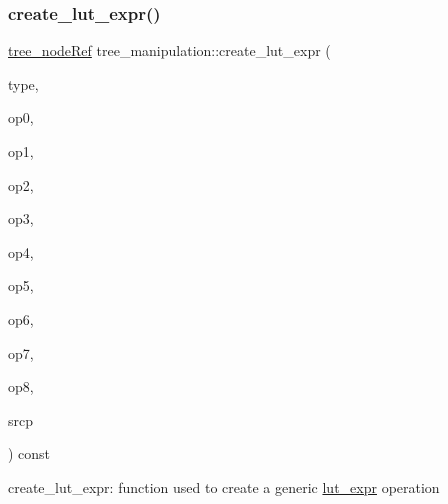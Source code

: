 \subsubsection{\texorpdfstring{create\+\_\+lut\+\_\+expr()}{create\_lut\_expr()}}
{\footnotesize\ttfamily \hyperlink{tree__node_8hpp_a6ee377554d1c4871ad66a337eaa67fd5}{tree\+\_\+node\+Ref} tree\+\_\+manipulation\+::create\+\_\+lut\+\_\+expr (\begin{DoxyParamCaption}\item[{const \hyperlink{tree__node_8hpp_a6ee377554d1c4871ad66a337eaa67fd5}{tree\+\_\+node\+Ref} \&}]{type,  }\item[{const \hyperlink{tree__node_8hpp_a6ee377554d1c4871ad66a337eaa67fd5}{tree\+\_\+node\+Ref} \&}]{op0,  }\item[{const \hyperlink{tree__node_8hpp_a6ee377554d1c4871ad66a337eaa67fd5}{tree\+\_\+node\+Ref} \&}]{op1,  }\item[{const \hyperlink{tree__node_8hpp_a6ee377554d1c4871ad66a337eaa67fd5}{tree\+\_\+node\+Ref} \&}]{op2,  }\item[{const \hyperlink{tree__node_8hpp_a6ee377554d1c4871ad66a337eaa67fd5}{tree\+\_\+node\+Ref} \&}]{op3,  }\item[{const \hyperlink{tree__node_8hpp_a6ee377554d1c4871ad66a337eaa67fd5}{tree\+\_\+node\+Ref} \&}]{op4,  }\item[{const \hyperlink{tree__node_8hpp_a6ee377554d1c4871ad66a337eaa67fd5}{tree\+\_\+node\+Ref} \&}]{op5,  }\item[{const \hyperlink{tree__node_8hpp_a6ee377554d1c4871ad66a337eaa67fd5}{tree\+\_\+node\+Ref} \&}]{op6,  }\item[{const \hyperlink{tree__node_8hpp_a6ee377554d1c4871ad66a337eaa67fd5}{tree\+\_\+node\+Ref} \&}]{op7,  }\item[{const \hyperlink{tree__node_8hpp_a6ee377554d1c4871ad66a337eaa67fd5}{tree\+\_\+node\+Ref} \&}]{op8,  }\item[{const std\+::string \&}]{srcp }\end{DoxyParamCaption}) const}



create\+\_\+lut\+\_\+expr\+: function used to create a generic \hyperlink{structlut__expr}{lut\+\_\+expr} operation 


